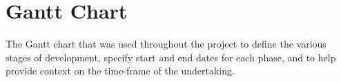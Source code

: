 \chapter{Gantt Chart}
\label{Gantt Chart}

The Gantt chart that was used throughout the project to define the various stages of development, specify start and end dates for each phase, and to help provide context on the time-frame of the undertaking.

